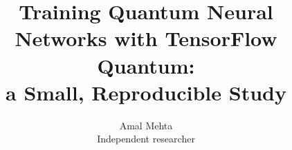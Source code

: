 \documentclass[10pt]{article}
\title{Training Quantum Neural Networks with TensorFlow Quantum:\\a Small, Reproducible Study}
\author{Amal Mehta\\Independent researcher}
\date{}
\begin{document}
\maketitle







\label{pw:mainend}



\end{document}
